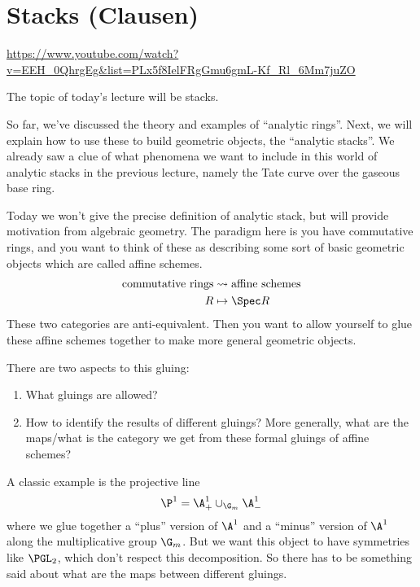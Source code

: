 
\section{Stacks (Clausen)}


\url{https://www.youtube.com/watch?v=EEH_0QhrgEg&list=PLx5f8IelFRgGmu6gmL-Kf_Rl_6Mm7juZO}
\renewcommand{\yt}[2]{\href{https://www.youtube.com/watch?v=EEH_0QhrgEg&list=PLx5f8IelFRgGmu6gmL-Kf_Rl_6Mm7juZO&t=#1}{#2}}
\vspace{1em}


The topic of today's lecture will be stacks.

So far, we've discussed the theory and examples of ``analytic rings''. Next, we will explain how to use these to build geometric objects, the ``analytic stacks''. We already saw a clue of what phenomena we want to include in this world of analytic stacks in the previous lecture, namely the Tate curve over the gaseous base ring.

Today we won't give the precise definition of analytic stack, but will provide motivation from algebraic geometry. The paradigm here is you have commutative rings, and you want to think of these as describing some sort of basic geometric objects which are called affine schemes.
\begin{align*}
  \text{commutative rings} &\leadsto \text{affine schemes}\\
  R &\mapsto \Spec R
\end{align*}
These two categories are anti-equivalent. Then you want to allow yourself to glue these affine schemes together to make more general geometric objects. 

There are two aspects to this gluing:
\begin{enumerate}
  \item What gluings are allowed?
  \item How to identify the results of different gluings? More generally, what are the maps/what is the category we get from these formal gluings of affine schemes?
\end{enumerate}

A classic example is the projective line
\[ \P^1 = \A^1_+ \cup_{\G_m} \A^1_- \]
where we glue together a ``plus'' version of $\A^1$ and a ``minus'' version of $\A^1$ along the multiplicative group $\G_m$. But we want this object to have symmetries like $\PGL_2$, which don't respect this decomposition. So there has to be something said about what are the maps between different gluings.

